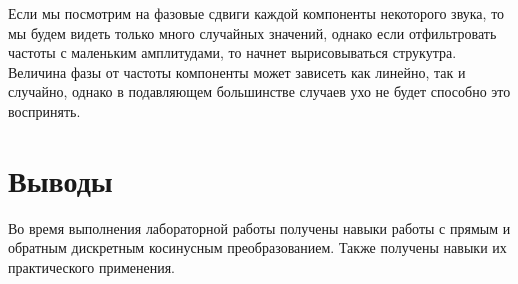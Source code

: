 \documentclass[a4paper,12pt]{report}
\begin{document}
    Если мы посмотрим на фазовые сдвиги каждой компоненты некоторого звука, то мы будем видеть только много случайных значений, однако если отфильтровать частоты с маленьким амплитудами, то начнет вырисовываться струкутра. Величина фазы от частоты компоненты может зависеть как линейно, так и случайно, однако в подавляющем большинстве случаев ухо не будет способно это воспринять.
    
    

\chapter{Выводы}

Во время выполнения лабораторной работы получены навыки работы с прямым и обратным дискретным косинусным преобразованием. Также получены навыки их практического применения.
\end{document}
